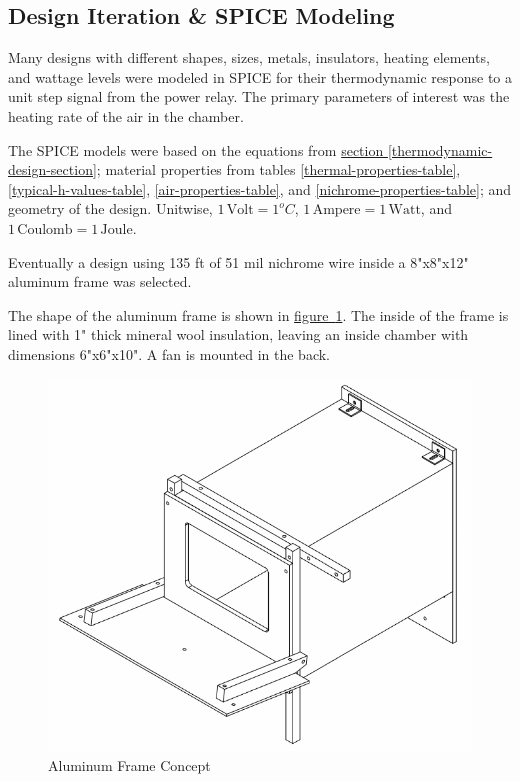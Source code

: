 \documentclass[10pt, twocolumn]{article}
\begin{document}
\subsection{Design Iteration \& SPICE Modeling}

Many designs with different shapes, sizes, metals, insulators,
heating elements, and wattage levels were modeled in SPICE for their
thermodynamic response to a unit step signal from the power relay.
The primary parameters of interest was the heating rate of the air
in the chamber.

The SPICE models were based on the equations from
\hyperref[thermodynamic-design-section]{section \ref{thermodynamic-design-section}};
material properties from tables \ref{thermal-properties-table}, \ref{typical-h-values-table},
\ref{air-properties-table}, and \ref{nichrome-properties-table}; and
geometry of the design.
Unitwise, $1\,\textrm{Volt}=1^{o}C$, $1\,\textrm{Ampere}=1\,\textrm{Watt}$,
\mbox{and $1\,\textrm{Coulomb}=1\,\textrm{Joule}$.}

Eventually a design using 135 ft of 51 mil nichrome wire inside a 8"x8"x12"
aluminum frame was selected.

The shape of the aluminum frame is shown in
\mbox{\hyperref[aluminum-frame-concept]{figure \ref{aluminum-frame-concept}}}.
The inside of the frame is lined with 1" thick mineral wool insulation,
leaving an inside chamber with dimensions 6"x6"x10".
A fan is mounted in the back.

\begin{figure}
	\centering
	\includegraphics[width=\columnwidth]{Figures/aluminum-frame-concept.pdf}
	\caption{Aluminum Frame Concept}
	\label{aluminum-frame-concept}
\end{figure}
\end{document}
